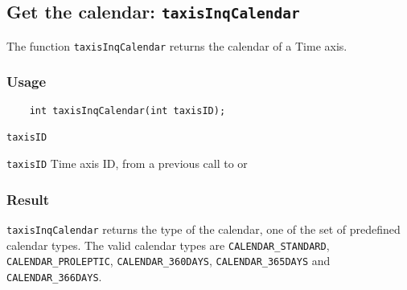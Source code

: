 \subsection{Get the calendar: \texttt{taxisInqCalendar}}
\label{taxisInqCalendar}

The function {\texttt{taxisInqCalendar}} returns the calendar of a Time axis.

\subsubsection*{Usage}

\begin{verbatim}
    int taxisInqCalendar(int taxisID);
\end{verbatim}

\hspace*{4mm}\begin{minipage}[]{15cm}
\begin{deflist}{\texttt{taxisID}\ }
\item[\texttt{taxisID}]
Time axis ID, from a previous call to {} or {}

\end{deflist}
\end{minipage}

\subsubsection*{Result}

{\texttt{taxisInqCalendar}} returns the type of the calendar,
one of the set of predefined {\CDI} calendar types.
The valid {\CDI} calendar types are {\texttt{CALENDAR\_STANDARD}}, {\texttt{CALENDAR\_PROLEPTIC}},
{\texttt{CALENDAR\_360DAYS}}, {\texttt{CALENDAR\_365DAYS}} and {\texttt{CALENDAR\_366DAYS}}.

